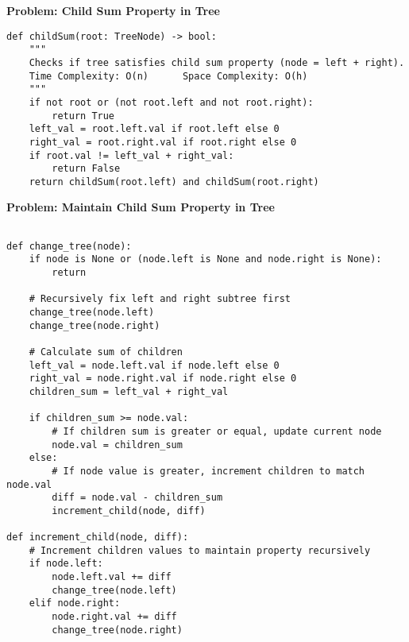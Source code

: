 \noindent\textbf{Problem: Child Sum Property in Tree}
\begin{verbatim}
def childSum(root: TreeNode) -> bool:
    """
    Checks if tree satisfies child sum property (node = left + right).
    Time Complexity: O(n)      Space Complexity: O(h)
    """
    if not root or (not root.left and not root.right):
        return True
    left_val = root.left.val if root.left else 0
    right_val = root.right.val if root.right else 0
    if root.val != left_val + right_val:
        return False
    return childSum(root.left) and childSum(root.right)
\end{verbatim}
\noindent\textbf{Problem: Maintain Child Sum Property in Tree}
\begin{verbatim}

def change_tree(node):
    if node is None or (node.left is None and node.right is None):
        return

    # Recursively fix left and right subtree first
    change_tree(node.left)
    change_tree(node.right)

    # Calculate sum of children
    left_val = node.left.val if node.left else 0
    right_val = node.right.val if node.right else 0
    children_sum = left_val + right_val

    if children_sum >= node.val:
        # If children sum is greater or equal, update current node
        node.val = children_sum
    else:
        # If node value is greater, increment children to match node.val
        diff = node.val - children_sum
        increment_child(node, diff)

def increment_child(node, diff):
    # Increment children values to maintain property recursively
    if node.left:
        node.left.val += diff
        change_tree(node.left)
    elif node.right:
        node.right.val += diff
        change_tree(node.right)
\end{verbatim}

